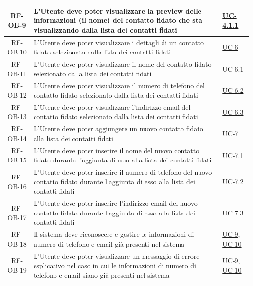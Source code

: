 \documentclass[a4paper,12pt]{article}
\begin{document}
\begin{center}
\begin{longtable}{|c|p{8.5cm}|>{\centering\arraybackslash}p{4cm}|}
RF-OB-9 & L'Utente deve poter visualizzare la preview delle informazioni (il nome) del contatto fidato che sta visualizzando dalla lista dei contatti fidati & \hyperref[subsec:UC-4.1.1]{UC-4.1.1} \\
\hline

RF-OB-10 & L'Utente deve poter visualizzare i dettagli di un contatto fidato selezionato dalla lista dei contatti fidati & \hyperref[subsec:UC-6]{UC-6} \\
\hline

RF-OB-11 & L'Utente deve poter visualizzare il nome del contatto fidato selezionato dalla lista dei contatti fidati & \hyperref[subsec:UC-6.1]{UC-6.1} \\
\hline

RF-OB-12 & L'Utente deve poter visualizzare il numero di telefono del contatto fidato selezionato dalla lista dei contatti fidati & \hyperref[subsec:UC-6.2]{UC-6.2} \\
\hline

RF-OB-13 & L'Utente deve poter visualizzare l'indirizzo email del contatto fidato selezionato dalla lista dei contatti fidati & \hyperref[subsec:UC-6.3]{UC-6.3} \\
\hline

RF-OB-14 & L'Utente deve poter aggiungere un nuovo contatto fidato alla lista dei contatti fidati & \hyperref[subsec:UC-7]{UC-7} \\
\hline

RF-OB-15 & L'Utente deve poter inserire il nome del nuovo contatto fidato durante l'aggiunta di esso alla lista dei contatti fidati & \hyperref[subsec:UC-7.1]{UC-7.1} \\
\hline

RF-OB-16 & L'Utente deve poter inserire il numero di telefono del nuovo contatto fidato durante l'aggiunta di esso alla lista dei contatti fidati & \hyperref[subsec:UC-7.2]{UC-7.2} \\
\hline

RF-OB-17 & L'Utente deve poter inserire l'indirizzo email del nuovo contatto fidato durante l'aggiunta di esso alla lista dei contatti fidati & \hyperref[subsec:UC-7.3]{UC-7.3} \\
\hline

RF-OB-18 & Il sistema deve riconoscere e gestire le informazioni di numero di telefono e email già presenti nel sistema & \hyperref[subsec:UC-9]{UC-9}, \hyperref[subsec:UC-10]{UC-10} \\
\hline

RF-OB-19 & L'Utente deve poter visualizzare un messaggio di errore esplicativo nel caso in cui le informazioni di numero di telefono e email siano già presenti nel sistema & \hyperref[subsec:UC-9]{UC-9}, \hyperref[subsec:UC-10]{UC-10} \\
\hline


\end{longtable}
\end{center}
\end{document}
